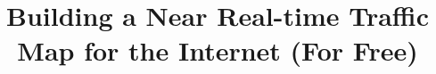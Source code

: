 \documentclass{sig-alt-hotnets}
\begin{document}
\title{Building a Near Real-time Traffic Map for the Internet (For Free)}
\author{}
\maketitle

%







{\scriptsize


}
\end{document}
